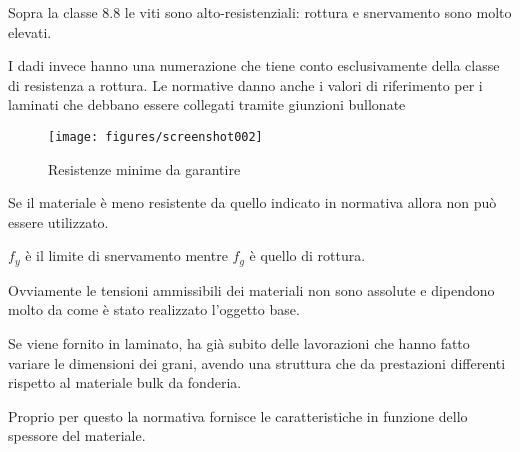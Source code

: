 \documentclass[a4paper, 15pt]{article}
\begin{document}
\begin{adjustwidth}{2in}{}
	Sopra la classe 8.8 le viti sono alto-resistenziali: rottura e snervamento sono molto elevati. \newline 
	
	I dadi invece hanno una numerazione che tiene conto esclusivamente della classe di resistenza a rottura. 
	\newpage 	
	Le normative danno anche i valori di riferimento per i laminati che debbano essere collegati tramite giunzioni bullonate 
	\begin{figure}[H]
		\centering
		\texttt{[image: figures/screenshot002]}
		\caption{Resistenze minime da garantire}
		\label{fig:screenshot002}
	\end{figure}
	Se il materiale è meno resistente da quello indicato in normativa allora non può essere utilizzato. 
	
	$f_y$ è il limite di snervamento mentre $f_g$ è quello di rottura. 
	
	Ovviamente le tensioni ammissibili dei materiali non sono assolute e dipendono molto da come è stato realizzato l'oggetto base. 
	
	Se viene fornito in laminato, ha già subito delle lavorazioni che hanno fatto variare le dimensioni dei grani, avendo una struttura che da prestazioni  differenti rispetto al materiale bulk da fonderia. 
	
	Proprio per questo la normativa fornisce le caratteristiche in funzione dello spessore del materiale.  
\end{adjustwidth}
\end{document}
